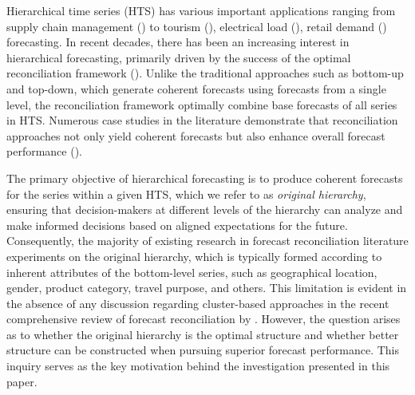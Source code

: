 \documentclass[a4paper,review,12pt,authoryear]{elsarticle}
\begin{document}
Hierarchical time series (HTS) has various important applications ranging from supply chain management (\citealp{syntetosSupplyChainForecasting2016}) to tourism (\citealp{kourentzesCrosstemporalCoherentForecasts2019}), electrical load (\citealp{jeonProbabilisticForecastReconciliation2019}), retail demand (\citealp{makridakisM5AccuracyCompetition2022}) forecasting. In recent decades, there has been an increasing interest in hierarchical forecasting, primarily driven by the success of the optimal reconciliation framework (\citealp{hyndmanOptimalCombinationForecasts2011,wickramasuriyaOptimalForecastReconciliation2019, panagiotelisProbabilisticForecastReconciliation2023}). Unlike the traditional approaches such as bottom-up and top-down, which generate coherent forecasts using forecasts from a single level, the reconciliation framework optimally combine base forecasts of all series in HTS. Numerous case studies in the literature demonstrate that reconciliation approaches not only yield coherent forecasts but also enhance overall forecast performance (\citealp{AthanasopoulosForecastReconciliationReview2023}).

The primary objective of hierarchical forecasting is to produce coherent forecasts for the series within a given HTS, which we refer to as \textit{original hierarchy}, ensuring that decision-makers at different levels of the hierarchy can analyze and make informed decisions based on aligned expectations for the future.
Consequently, the majority of existing research in forecast reconciliation literature experiments on the original hierarchy, which is typically formed according to inherent attributes of the bottom-level series, such as geographical location, gender, product category, travel purpose, and others. This limitation is evident in the absence of any discussion regarding cluster-based approaches in the recent comprehensive review of forecast reconciliation by \cite{AthanasopoulosForecastReconciliationReview2023}. However, the question arises as to whether the original hierarchy is the optimal structure and whether better structure can be constructed when pursuing superior forecast performance.  This inquiry serves as the key motivation behind the investigation presented in this paper.
\end{document}
